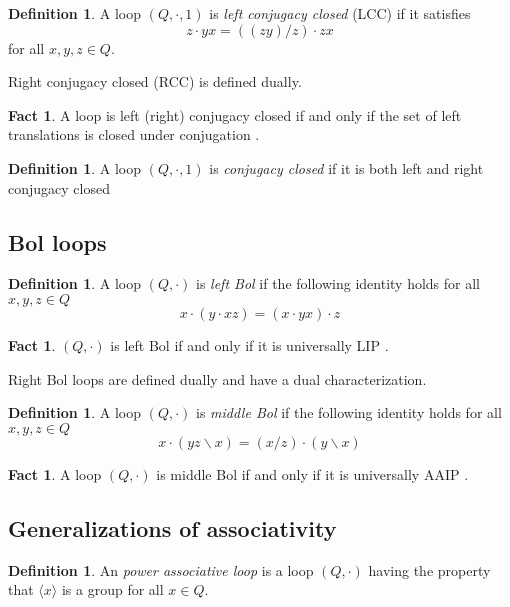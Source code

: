 \documentclass[12pt]{report}
\theoremstyle{definition}
\newtheorem{fct}[thm]{Fact}
\newtheorem{dfn}[thm]{Definition}
\newcommand{\ldv}{\backslash}       %
\newcommand{\rdv}{/}                %
\begin{document}
\begin{dfn}
  A loop $(Q, \cdot, 1)$ is \emph{left conjugacy closed} (LCC) if it satisfies
  \[z\cdot yx = ((zy)\rdv z)\cdot zx\]
  for all $x, y, z\in Q$.
\end{dfn}

Right conjugacy closed (RCC) is defined dually.

\begin{fct}
  A loop is left (right) conjugacy closed if and only if the set of left translations is closed under conjugation \cite{PACC}.
\end{fct}

\begin{dfn}
  A loop $(Q, \cdot, 1)$ is \emph{conjugacy closed} if it is both left and right conjugacy closed
\end{dfn}

\subsection{Bol loops}

\begin{dfn}
  A loop $(Q, \cdot)$ is \emph{left Bol} if the following identity holds for all $x, y, z\in Q$
  \[x\cdot (y\cdot xz) = (x\cdot yx)\cdot z\]
\end{dfn}

\begin{fct}
  $(Q, \cdot)$ is left Bol if and only if it is universally LIP \cite{SUF}.
\end{fct}

Right Bol loops are defined dually and have a dual characterization.

\begin{dfn}
  A loop $(Q, \cdot)$ is \emph{middle Bol} if the following identity holds for all $x, y, z\in Q$
  \[x\cdot (yz\ldv x) = (x\rdv z)\cdot (y\ldv x)\]
\end{dfn}

\begin{fct}
  A loop $(Q, \cdot)$ is middle Bol if and only if it is universally AAIP \cite{SUF}.
\end{fct}

\subsection{Generalizations of associativity}

\begin{dfn}
  An \emph{power associative loop} is a loop $(Q, \cdot)$ having the property that $\langle x\rangle$ is a group
    for all $x\in Q$.
\end{dfn}
\end{document}
